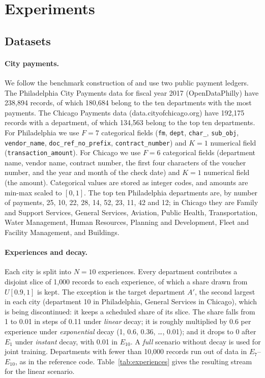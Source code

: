 \documentclass{article} %
\begin{document}
\section{Experiments}\label{sec:experiments}
\subsection{Datasets}
\paragraph{City payments.}
We follow the benchmark construction of \citet{hemati2022continual} and use
two public payment ledgers. The Philadelphia City Payments data for fiscal year
2017 (OpenDataPhilly) have 238{,}894 records, of which 180{,}684 belong to the
ten departments with the most payments. The Chicago Payments data
(data.cityofchicago.org) have 192{,}175 records with a department, of which
134{,}563 belong to the top ten departments. For Philadelphia we use $F = 7$
categorical fields (\texttt{fm}, \texttt{dept}, \texttt{char\_},
\texttt{sub\_obj}, \texttt{vendor\_name}, \texttt{doc\_ref\_no\_prefix},
\texttt{contract\_number}) and $K = 1$ numerical field
(\texttt{transaction\_amount}). For Chicago we use $F = 6$ categorical fields
(department name, vendor name, contract number, the first four characters of
the voucher number, and the year and month of the check date) and $K = 1$
numerical field (the amount). Categorical values are stored as integer codes,
and amounts are min-max scaled to $[0, 1]$. The top ten Philadelphia
departments are, by number of payments, 25, 10, 22, 28, 14, 52, 23, 11, 42
and 12; in Chicago they are Family and Support Services, General Services,
Aviation, Public Health, Transportation, Water Management, Human Resources,
Planning and Development, Fleet and Facility Management, and Buildings.

\paragraph{Experiences and decay.}
Each city is split into $N = 10$ experiences. Every department contributes a
disjoint slice of 1{,}000 records to each experience, of which a share drawn
from $U[0.9, 1]$ is kept. The exception is the target department $A'$, the
second largest in each city (department 10 in Philadelphia, General Services
in Chicago), which is being discontinued: it keeps a scheduled share of its
slice. The share falls from 1 to 0.01 in steps of 0.11 under \emph{linear}
decay; it is roughly multiplied by 0.6 per experience under \emph{exponential}
decay (1, 0.6, 0.36, \dots, 0.01); and it drops to 0 after $E_1$ under
\emph{instant} decay, with 0.01 in $E_{10}$. A \emph{full} scenario without
decay is used for joint training. Departments with fewer than 10{,}000 records
run out of data in $E_7$--$E_{10}$, as in the reference code.
Table~\ref{tab:experiences} gives the resulting stream for the linear scenario.
\end{document}

